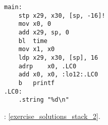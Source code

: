 \begin{lstlisting}[caption=\Optimizing GCC 4.9 (ARM64)]
main:
	stp	x29, x30, [sp, -16]!
	mov	x0, 0
	add	x29, sp, 0
	bl	time
	mov	x1, x0
	ldp	x29, x30, [sp], 16
	adrp	x0, .LC0
	add	x0, x0, :lo12:.LC0
	b	printf
.LC0:
	.string	"%d\n"
\end{lstlisting}



\Answer{}: \ref{exercise_solutions_stack_2}.

